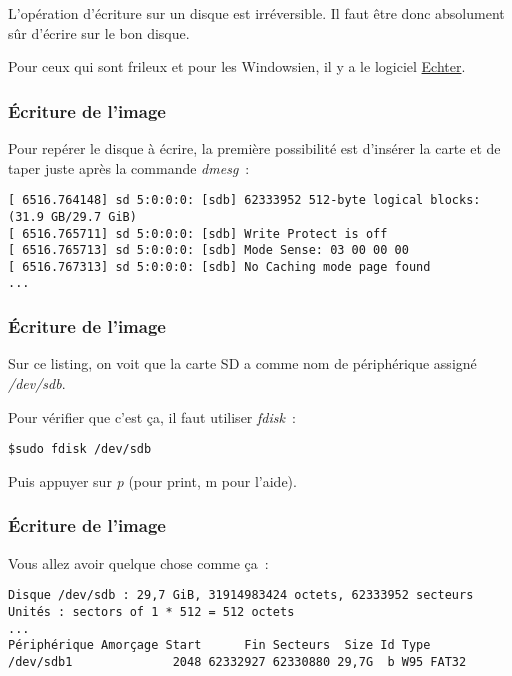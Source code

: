\begin{frame}[containsverbatim]
L'opération d'écriture sur un disque est irréversible. Il faut être donc absolument sûr d'écrire sur le bon disque.

Pour ceux qui sont frileux et pour les Windowsien, il y a le logiciel \href{https://etcher.io/}{Echter}.

\end{frame}

\begin{frame}[containsverbatim]
\frametitle{\'Ecriture de l'image}

Pour repérer le disque à écrire, la première possibilité est d'insérer la carte et de taper juste après la commande \emph{dmesg}~:

\begin{verbatim}
[ 6516.764148] sd 5:0:0:0: [sdb] 62333952 512-byte logical blocks: (31.9 GB/29.7 GiB)
[ 6516.765711] sd 5:0:0:0: [sdb] Write Protect is off
[ 6516.765713] sd 5:0:0:0: [sdb] Mode Sense: 03 00 00 00
[ 6516.767313] sd 5:0:0:0: [sdb] No Caching mode page found
...
\end{verbatim}

\end{frame}

\begin{frame}[containsverbatim]
\frametitle{\'Ecriture de l'image}

Sur ce listing, on voit que la carte SD a comme nom de périphérique assigné \emph{/dev/sdb}.

Pour vérifier que c'est ça, il faut utiliser \emph{fdisk}~:
\begin{verbatim}
$sudo fdisk /dev/sdb
\end{verbatim}

Puis appuyer sur \emph{p} (pour print, m pour l'aide).
\end{frame}

\begin{frame}[containsverbatim]
\frametitle{\'Ecriture de l'image}

Vous allez avoir quelque chose comme ça~:
\begin{verbatim}
Disque /dev/sdb : 29,7 GiB, 31914983424 octets, 62333952 secteurs
Unités : sectors of 1 * 512 = 512 octets
...
Périphérique Amorçage Start      Fin Secteurs  Size Id Type
/dev/sdb1              2048 62332927 62330880 29,7G  b W95 FAT32
\end{verbatim}

\end{frame}

